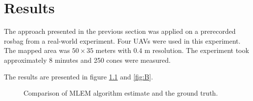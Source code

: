 
\chapter{Results\label{chap:results}}

The approach presented in the previous section was applied on a prerecorded rosbag from a real-world experiment.
Four \ac{UAV}s were used in this experiment.
The mapped area was $50 \times 35$ meters with $0.4$ m resolution.
The experiment took approximately 8 minutes and 250 cones were measured.

The results are presented in figure \ref{fig:A} and \ref{fig:B}. 
\begin{figure}[!h]
  \centering
  \label{fig:A}
  \caption{Comparison of MLEM algorithm estimate and the ground truth.}
\end{figure}


